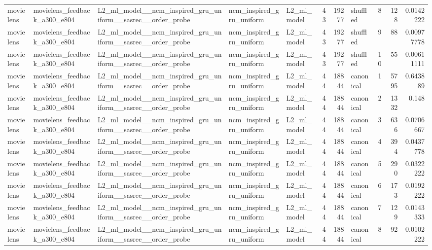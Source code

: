 \begin{table}[htbp!]
\begin{tabular}{lllllrrlrrr}
movielens & movielens\_feedback\_a300\_e804 & L2\_ml\_model\_\_ncm\_inspired\_gru\_uniform\_\_sasrec\_\_order\_probe & ncm\_inspired\_gru\_uniform & L2\_ml\_model & 43 & 19277 & shuffled & 8 & 128 & 0.0142222 \\
movielens & movielens\_feedback\_a300\_e804 & L2\_ml\_model\_\_ncm\_inspired\_gru\_uniform\_\_sasrec\_\_order\_probe & ncm\_inspired\_gru\_uniform & L2\_ml\_model & 43 & 19277 & shuffled & 9 & 88 & 0.00977778 \\
movielens & movielens\_feedback\_a300\_e804 & L2\_ml\_model\_\_ncm\_inspired\_gru\_uniform\_\_sasrec\_\_order\_probe & ncm\_inspired\_gru\_uniform & L2\_ml\_model & 43 & 19277 & shuffled & 10 & 55 & 0.00611111 \\
movielens & movielens\_feedback\_a300\_e804 & L2\_ml\_model\_\_ncm\_inspired\_gru\_uniform\_\_sasrec\_\_order\_probe & ncm\_inspired\_gru\_uniform & L2\_ml\_model & 44 & 18844 & canonical & 1 & 5795 & 0.643889 \\
movielens & movielens\_feedback\_a300\_e804 & L2\_ml\_model\_\_ncm\_inspired\_gru\_uniform\_\_sasrec\_\_order\_probe & ncm\_inspired\_gru\_uniform & L2\_ml\_model & 44 & 18844 & canonical & 2 & 1332 & 0.148 \\
movielens & movielens\_feedback\_a300\_e804 & L2\_ml\_model\_\_ncm\_inspired\_gru\_uniform\_\_sasrec\_\_order\_probe & ncm\_inspired\_gru\_uniform & L2\_ml\_model & 44 & 18844 & canonical & 3 & 636 & 0.0706667 \\
movielens & movielens\_feedback\_a300\_e804 & L2\_ml\_model\_\_ncm\_inspired\_gru\_uniform\_\_sasrec\_\_order\_probe & ncm\_inspired\_gru\_uniform & L2\_ml\_model & 44 & 18844 & canonical & 4 & 394 & 0.0437778 \\
movielens & movielens\_feedback\_a300\_e804 & L2\_ml\_model\_\_ncm\_inspired\_gru\_uniform\_\_sasrec\_\_order\_probe & ncm\_inspired\_gru\_uniform & L2\_ml\_model & 44 & 18844 & canonical & 5 & 290 & 0.0322222 \\
movielens & movielens\_feedback\_a300\_e804 & L2\_ml\_model\_\_ncm\_inspired\_gru\_uniform\_\_sasrec\_\_order\_probe & ncm\_inspired\_gru\_uniform & L2\_ml\_model & 44 & 18844 & canonical & 6 & 173 & 0.0192222 \\
movielens & movielens\_feedback\_a300\_e804 & L2\_ml\_model\_\_ncm\_inspired\_gru\_uniform\_\_sasrec\_\_order\_probe & ncm\_inspired\_gru\_uniform & L2\_ml\_model & 44 & 18844 & canonical & 7 & 129 & 0.0143333 \\
movielens & movielens\_feedback\_a300\_e804 & L2\_ml\_model\_\_ncm\_inspired\_gru\_uniform\_\_sasrec\_\_order\_probe & ncm\_inspired\_gru\_uniform & L2\_ml\_model & 44 & 18844 & canonical & 8 & 92 & 0.0102222 \\

\end{tabular}
\end{table}
